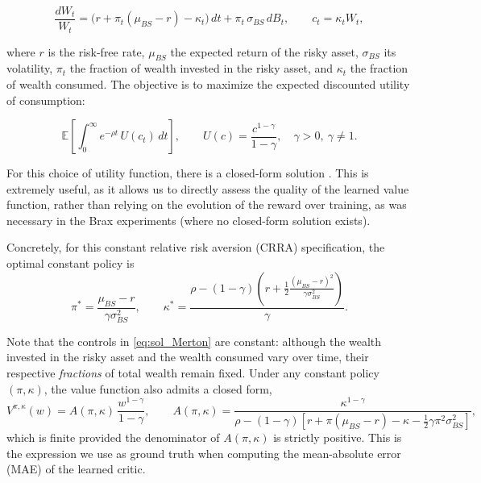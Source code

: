 \documentclass{article}
\begin{document}
\begin{equation}
\frac{d W_t}{W_t} = \big(r + \pi_t(\mu_{BS}-r) - \kappa_t\big)\,dt + \pi_t\,\sigma_{BS}\,dB_t,
\qquad c_t = \kappa_t W_t,
\end{equation}

where $r$ is the risk-free rate, $\mu_{BS}$ the expected return of the risky asset, $\sigma_{BS}$ its volatility, $\pi_t$ the fraction of wealth invested in the risky asset, and $\kappa_t$ the fraction of wealth consumed. The objective is to maximize the expected discounted utility of consumption:

\begin{equation}\label{Merton-cost}
\mathbb{E}\!\left[\int_0^\infty e^{-\rho t}\, U(c_t)\,dt\right],
\qquad U(c)=\frac{c^{1-\gamma}}{1-\gamma}, \quad \gamma > 0,\ \gamma \neq 1.
\end{equation}

For this choice of utility function, there is a closed-form solution \citep{merton1971optimum}. This is extremely useful, as it allows us to directly assess the quality of the learned value function, rather than relying on the evolution of the reward over training, as was necessary in the Brax experiments (where no closed-form solution exists).

Concretely, for this constant relative risk aversion (CRRA) specification, the optimal constant policy is
\begin{equation}\label{eq:sol_Merton}
     \pi^* = \frac{\mu_{BS}-r}{\gamma\sigma_{BS}^2},
        \qquad
        \kappa^* = \frac{\rho-(1-\gamma)\left(r + \frac{1}{2}\frac{(\mu_{BS}-r)^2}{\gamma\sigma_{BS}^2}\right)}{\gamma}.
\end{equation}

Note that the controls in \cref{eq:sol_Merton} are constant: although the wealth invested in the risky asset and the wealth consumed vary over time, their respective \emph{fractions} of total wealth remain fixed. Under any constant policy $(\pi,\kappa)$, the value function also admits a closed form,
\begin{equation}\label{eq:value_Merton}
     V^{\pi,\kappa}(w)=A(\pi,\kappa)\,\frac{w^{1-\gamma}}{1-\gamma},
     \qquad
      A(\pi,\kappa)=
            \frac{\kappa^{1-\gamma}}
            {\rho-(1-\gamma)\!\left[r+\pi(\mu_{BS}-r)-\kappa-\tfrac{1}{2}\gamma\pi^2\sigma_{BS}^2\right]},
\end{equation}
which is finite provided the denominator of $A(\pi,\kappa)$ is strictly positive. This is the expression we use as ground truth when computing the mean-absolute error (MAE) of the learned critic.
\end{document}
